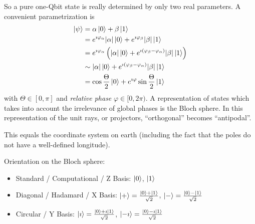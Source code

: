 So a pure one-Qbit state is really determined by only two real parameters.
A convenient para\-metrization is
\[
\begin{aligned}
\ket{\psi}
&=
\alpha \ket{0} + \beta \ket{1} \\
&=
e^{\imath \varphi_\alpha}|\alpha| \ket{0} + e^{\imath \varphi_\beta}|\beta| \ket{1} \\
&=
e^{\imath \varphi_\alpha}\left(|\alpha| \ket{0} + e^{\imath (\varphi_\beta-\varphi_\alpha)}|\beta| \ket{1}\right) \\
&\sim
|\alpha| \ket{0} + e^{\imath (\varphi_\beta-\varphi_\alpha)}|\beta| \ket{1} \\
&= 
\cos\frac{\Theta}{2}\ket{0}
+
e^{\imath\varphi}\sin\frac{\Theta}{2}\ket{1}
\end{aligned}
\]
with
\(
\Theta \in [0,\pi]
\)
and
\emph{relative phase}
\(
\varphi \in [0,2\pi)
\).
A representation of states which takes into account the irrelevance of global phases is the Bloch sphere. 
In this representation of the unit rays, or projectors, ``orthogonal'' becomes ``antipodal''.



This equals the coordinate system on earth (including the fact that the poles do not have a well-defined longitude).

Orientation on the Bloch sphere:
\begin{itemize}
\item Standard / Computational / Z Basis: $\ket{0}$, $\ket{1}$ 
\item Diagonal / Hadamard / X Basis: $\ket{+} = \frac{\ket{0} + \ket{1}}{\sqrt{2}}$, $\ket{-} = \frac{\ket{0} - \ket{1}}{\sqrt{2}}$
\item Circular / Y Basis: $\ket{\imath} = \smash[t]{\frac{\ket{0} + \imath \ket{1}}{\sqrt{2}}}$, $\ket{-\imath} = \smash[t]{\frac{\ket{0} - \imath \ket{1}}{\sqrt{2}}}$
\end{itemize}

